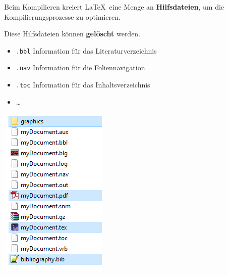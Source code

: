 \begin{frame}

\begin{minipage}{.58\textwidth}
Beim Kompilieren kreiert \LaTeX\ eine Menge an \textbf{Hilfsdateien}, um die Kompilierungsprozesse zu optimieren. 

Diese Hilfsdateien können \textbf{gelöscht} werden.

\begin{itemize}
	\item \texttt{.bbl} \ras Information für das Literaturverzeichnis
	
	\item \texttt{.nav} \ras Information für die Foliennavigation
	
	\item \texttt{.toc} \ras Information für das Inhaltsverzeichnis
	
	\item \dots 
\end{itemize}

\end{minipage}
%
\begin{minipage}{.40\textwidth}
	\centering
	\includegraphics[width=.9\linewidth]{../../texfiles-beamer/tex-material/WissArb-latex/latexDateien}
	
\end{minipage}

\end{frame}


